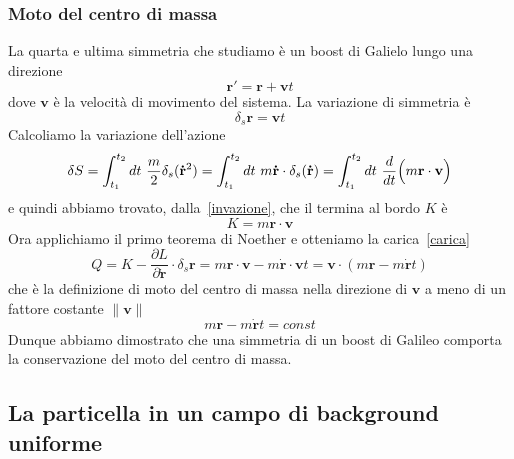 \begin{example}
    \subsubsection{Moto del centro di massa}
        La quarta e ultima simmetria che studiamo è un boost di Galielo lungo una direzione
    \begin{equation}
        \mathbf r' = \mathbf r + \mathbf v t
    \end{equation}
        dove $\mathbf v$ è la velocità di movimento del sistema. La variazione di simmetria è 
    \begin{equation*}
        \delta_s \mathbf r = \mathbf v t
    \end{equation*}
        Calcoliamo la variazione dell'azione
    \begin{equation}
        \delta S = \int_{t_1}^{t_2}dt~ \frac{m}{2} \delta_s (\mathbf{\dot r}^2) = \int_{t_1}^{t_2}dt~ m \mathbf {\dot r} \cdot \delta_s (\mathbf{\dot r})= \int_{t_1}^{t_2}dt~ \frac{d}{dt} \Big( m \mathbf r \cdot \mathbf v \Big) 
    \end{equation}
        e quindi abbiamo trovato, dalla~\eqref{invazione}, che il termina al bordo $K$ è 
    \begin{equation*}
        K = m \mathbf r \cdot \mathbf v 
    \end{equation*}
        Ora applichiamo il primo teorema di Noether e otteniamo la carica~\eqref{carica} 
    \begin{equation}
        Q = K - \frac{\partial L}{\partial \mathbf{\dot r}} \cdot \delta_s \mathbf r =  m \mathbf r \cdot \mathbf v - m \mathbf{\dot r} \cdot \mathbf v t = \mathbf v \cdot (m \mathbf r - m \mathbf{\dot r} t)
    \end{equation}
        che è la definizione di moto del centro di massa nella direzione di $\mathbf v$ a meno di un fattore costante $\|\mathbf v \|$
    \begin{equation*}
        m \mathbf r - m \mathbf{\dot r} t = const
    \end{equation*}
        Dunque abbiamo dimostrato che una simmetria di un boost di Galileo comporta la conservazione del moto del centro di massa.

    \end{example}

\subsection{La particella in un campo di background uniforme}

